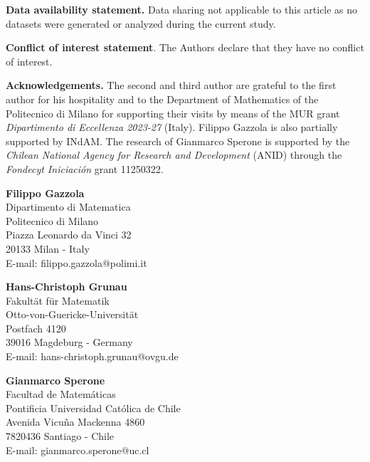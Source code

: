 \documentclass[11pt]{article}
\theoremstyle{plain}
\theoremstyle{definition}
\numberwithin{equation}{section}
\begin{document}
\bigskip

\noindent
{\bf Data availability statement.} Data sharing not applicable to this article as no datasets were generated or analyzed during the current study.
\par\smallskip
\noindent
{\bf Conflict of interest statement}.  The Authors declare that they have no conflict of interest.
\par\smallskip
\noindent
{\bf Acknowledgements.} The second  and third author are grateful to the first author for his hospitality and to
the Department of Mathematics of the Politecnico di Milano for supporting their visits  by means of  the MUR grant {\em Dipartimento di Eccellenza 2023-27} (Italy).
Filippo Gazzola is also partially supported by INdAM. The research of Gianmarco Sperone is supported by the \textit{Chilean National Agency for Research and Development} (ANID) through the \textit{Fondecyt Iniciación} grant 11250322.\par

{}



\vspace{5mm}
\noindent
\begin{minipage}{53mm}
{\footnotesize	\textbf{Filippo Gazzola}\\
	Dipartimento di Matematica\\
	Politecnico di Milano\\
	Piazza Leonardo da Vinci 32\\
	20133 Milan - Italy\\
	E-mail: filippo.gazzola@polimi.it}
	\end{minipage}
\begin{minipage}{60mm}
	{\footnotesize	\textbf{Hans-Christoph Grunau}\\
		Fakult\"at f\"ur Matematik\\
		Otto-von-Guericke-Universit\"at\\
		Postfach 4120\\
		39016 Magdeburg - Germany\\
		E-mail: hans-christoph.grunau@ovgu.de}
\end{minipage}
\begin{minipage}{57mm}
{\footnotesize	\textbf{Gianmarco Sperone}\\
	Facultad de Matemáticas\\
	Pontificia Universidad Católica de Chile\\
	Avenida Vicuña Mackenna 4860\\
	7820436 Santiago - Chile\\
	E-mail: gianmarco.sperone@uc.cl}
\end{minipage}
\end{document}
